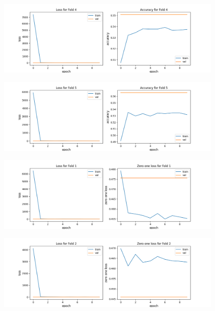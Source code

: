 \begin{appendices}
\begin{figure}[hbtp]
\centering
\includegraphics[scale=0.5]{../Images/mlp02_fold_4_plot.png}
\end{figure}
\begin{figure}[hbtp]

\centering
\includegraphics[scale=0.5]{../Images/mlp02_fold_5_plot.png}
\end{figure}
\begin{figure}[hbtp]

\centering
\includegraphics[scale=0.5]{../Images/mlp02_fold_1_zeroplot.png}
\end{figure}
\begin{figure}[hbtp]

\centering
\includegraphics[scale=0.5]{../Images/mlp02_fold_2_zeroplot.png}
\end{figure}
\begin{figure}[hbtp]


\end{figure}
\end{appendices}
